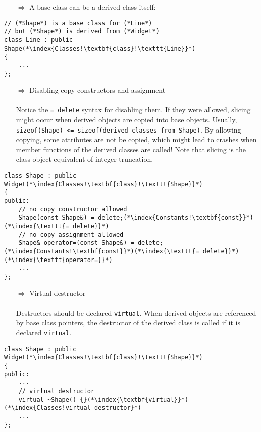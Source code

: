 \documentclass[10pt]{article}
\begin{document}
\begin{enumerate}
\item[$\Rightarrow$] A base class can be a derived class itself:
\end{enumerate}
\begin{lstlisting}
// (*Shape*) is a base class for (*Line*)
// but (*Shape*) is derived from (*Widget*)
class Line : public Shape(*\index{Classes!\textbf{class}!\texttt{Line}}*)
{
    ...
};
\end{lstlisting}
\begin{enumerate}
\item[$\Rightarrow$] Disabling copy constructors and assignment\\ \\ Notice the \texttt{= delete} syntax for disabling them. If they were allowed, slicing might occur when derived objects are copied into base objects. Usually, \texttt{sizeof(Shape) <= sizeof(derived classes from Shape)}. By allowing copying, some attributes are not be copied, which might lead to crashes when member functions of the derived classes are called! Note that slicing is the class object equivalent of integer truncation.
\end{enumerate}
\begin{lstlisting}
class Shape : public Widget(*\index{Classes!\textbf{class}!\texttt{Shape}}*)
{
public:
    // no copy constructor allowed
    Shape(const Shape&) = delete;(*\index{Constants!\textbf{const}}*)(*\index{\texttt{= delete}}*)
    // no copy assignment allowed
    Shape& operator=(const Shape&) = delete;(*\index{Constants!\textbf{const}}*)(*\index{\texttt{= delete}}*)(*\index{\texttt{operator=}}*)
    ...
};
\end{lstlisting}
\begin{enumerate}
\item[$\Rightarrow$] Virtual destructor\\ \\ Destructors should be declared \texttt{virtual}. When derived
objects are referenced by base class pointers, the destructor of the derived class is called if it is declared \texttt{virtual}.
\end{enumerate}
\begin{lstlisting}
class Shape : public Widget(*\index{Classes!\textbf{class}!\texttt{Shape}}*)
{
public:
    ...
    // virtual destructor
    virtual ~Shape() {}(*\index{\textbf{virtual}}*)(*\index{Classes!virtual destructor}*)
    ...
};
\end{lstlisting}
\end{document}
